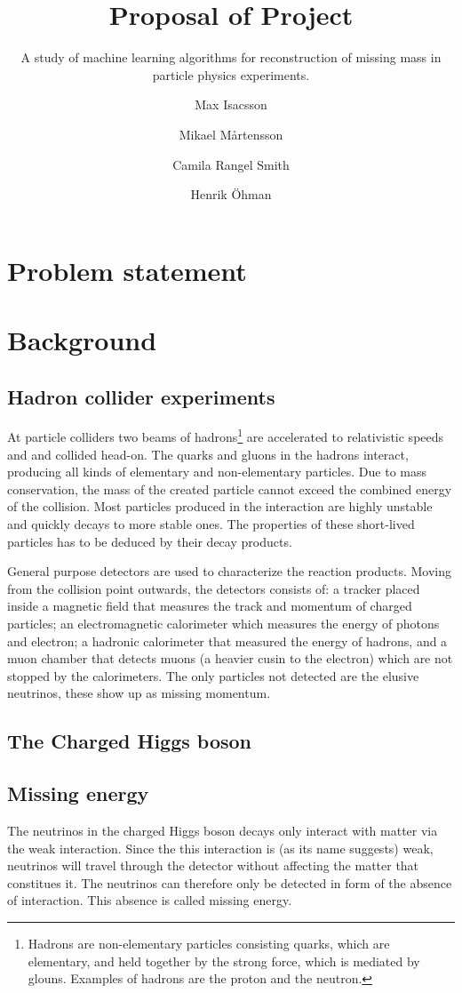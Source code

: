 \documentclass{scrartcl}
\title{Proposal of Project}
\subtitle{A study of machine learning algorithms for reconstruction of missing mass in particle physics experiments.}
\author[1]{Max Isacsson}
\author[2]{Mikael M\aa rtensson}
\author[3]{Camila Rangel Smith}
\author[4]{Henrik \"{O}hman}
\affil[1]{\small\url{max.isacsson@physics.uu.se}}
\affil[2]{\url{mikael.martensson@physics.uu.se}}
\affil[3]{\url{camila.rangel@physics.uu.se}}
\affil[4]{\url{ohman@cern.ch}}
\begin{document}
\maketitle

\section{Problem statement}


\section{Background}
\subsection{Hadron collider experiments}
At particle colliders two beams of hadrons\footnote{Hadrons are non-elementary particles consisting quarks, which are elementary, and held together by the strong force, which is mediated by glouns. Examples of hadrons are the proton and the neutron.} are accelerated to relativistic speeds and and collided head-on. The quarks and gluons in the hadrons interact, producing all kinds of elementary and non-elementary particles. Due to mass conservation, the mass of the created particle cannot exceed the combined energy of the collision. Most particles produced in the interaction are highly unstable and quickly decays to more stable ones. The properties of these short-lived particles has to be deduced by their decay products.

General purpose detectors are used to characterize the reaction products. Moving from the collision point outwards, the detectors consists of: a tracker placed inside a magnetic field that measures the track and momentum of charged particles; an electromagnetic calorimeter which measures the energy of photons and electron; a hadronic calorimeter that measured the energy of hadrons, and a muon chamber that detects muons (a heavier cusin to the electron) which are not stopped by the calorimeters. The only particles not detected are the elusive neutrinos, these show up as missing momentum.

\subsection{The Charged Higgs boson}
\subsection{Missing energy}
The neutrinos in the charged Higgs boson decays only interact with matter via the weak interaction. Since the this interaction is (as its name suggests) weak, neutrinos will travel through the detector without affecting the matter that constitues it. The neutrinos can therefore only be detected in form of the absence of interaction. This absence is called missing energy.
\end{document}
